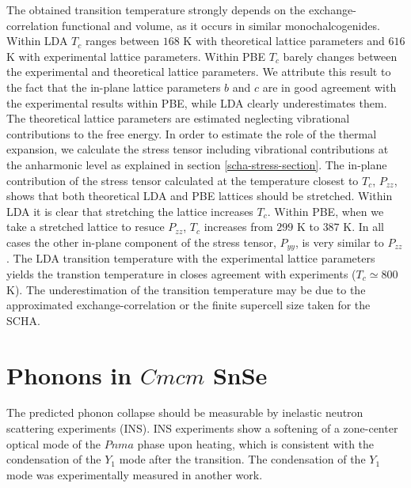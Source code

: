 The obtained transition temperature strongly depends on the exchange-correlation functional and volume, as it occurs in similar monochalcogenides\cite{ribeiro2018strong}. Within LDA $T_{c}$ ranges between $168$ K with 
theoretical lattice parameters and $616$ K with experimental lattice parameters. Within PBE $T_{c}$ barely changes between the experimental and theoretical lattice parameters. We attribute this result to the fact that 
the in-plane lattice parameters $b$ and $c$ are in good agreement with the experimental results within PBE, while LDA clearly underestimates them. The theoretical lattice parameters are estimated neglecting vibrational 
contributions to the free energy. In order to estimate the role of the thermal expansion, we calculate the stress tensor including vibrational contributions at the anharmonic level as explained in 
section \ref{scha-stress-section}. The in-plane contribution of the stress tensor calculated at the temperature closest to $T_{c}$, $P_{zz}$, shows that both theoretical LDA and PBE lattices should be stretched. Within LDA it 
is clear that stretching the lattice increases $T_{c}$. Within PBE, when we take a stretched lattice to resuce $P_{zz}$, $T_{c}$ increases from $299$ K to $387$ K. In all cases the other in-plane component of the stress tensor, 
$P_{yy}$, is very similar to $P_{zz}$. The LDA transition temperature with the experimental lattice parameters yields the transtion temperature in closes agreement with experiments ($T_{c}\simeq800$ K). The underestimation of the 
transition temperature may be due to the approximated exchange-correlation or the finite supercell size taken for the SCHA. \\

\section{Phonons in $Cmcm$ SnSe}

The predicted phonon collapse should be measurable by inelastic neutron scattering experiments (INS). INS experiments\cite{li2015orbitally} show a softening of a zone-center optical mode of the $Pnma$ phase upon heating, which
is consistent with the condensation of the $Y_{1}$ mode after the transition. The condensation of the $Y_{1}$ mode 
was experimentally measured in another work\cite{chatterji2018soft}. \\

